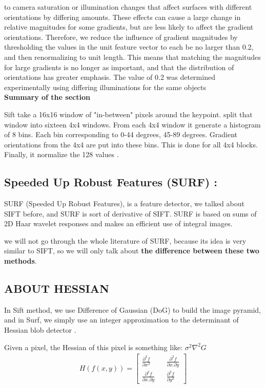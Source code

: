 to camera saturation or illumination changes that affect surfaces with different orientations
by differing amounts. These effects can cause a large change in relative magnitudes for
some gradients, but are less likely to affect the gradient orientations. Therefore, we reduce
the influence of gradient magnitudes by thresholding the values in the unit feature vector to
each be no larger than 0.2, and then renormalizing to unit length. This means that matching
the magnitudes for large gradients is no longer as important, and that the distribution of
orientations has greater emphasis. The value of 0.2 was determined experimentally using
differing illuminations for the same objects\\

\textbf{Summary of the section }

Sift take  a 16x16 window of "in-between" pixels around the keypoint. split that window into sixteen 4x4 windows. From each 4x4 window it generate a histogram of 8 bins. Each bin corresponding to 0-44 degrees, 45-89 degrees. Gradient orientations from the 4x4 are put into these bins. This is done for all 4x4 blocks. Finally, it normalize the 128 values .

\subsection{Speeded Up Robust Features (SURF) :}
SURF (Speeded Up Robust Features), is a feature detector, we talked about SIFT before, and SURF is sort of derivative of SIFT. SURF is based on sums of 2D Haar wavelet responses and makes an efficient use of integral images.

we will not go through  the whole literature  of SURF, because its idea is very similar to SIFT, so we will only talk about \textbf{the difference between these two methods}.

\subsection{ABOUT HESSIAN}
In Sift method, we use Difference of Gaussian (DoG) to build the image pyramid, and in Surf, we simply use an integer approximation to the determinant of Hessian blob detector .

Given a pixel, the Hessian of this pixel is something like:
$\sigma^2\nabla^2G$ \\

\begin{gather}
H(f(x,y)) =
\begin{bmatrix}
                 {\frac {\partial^2 f} {\partial x^2}} && { \frac {\partial^2 f} {\partial x.\partial y} }\\
                 {\frac  {\partial^2 f}{\partial x.\partial y}} && { \frac {\partial^2 f} {\partial y^2}}
\end{bmatrix}
\end{gather}

